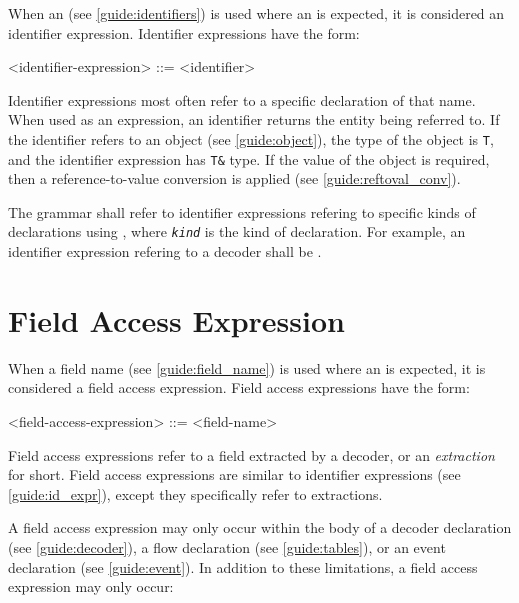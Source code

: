 When an  (see \ref{guide:identifiers}) is used where an  is expected, it is considered an identifier expression. Identifier expressions have the form:

\begin{minip}
\begin{grammar}
<identifier-expression> ::= <identifier>
\end{grammar}
\end{minip}

Identifier expressions most often refer to a specific declaration of that name. When used as an expression, an identifier returns the entity being referred to. If the identifier refers to an object (see \ref{guide:object}), the type of the object is \texttt{T}, and the identifier expression has \texttt{T\&} type. If the value of the object is required, then a reference-to-value conversion is applied (see \ref{guide:reftoval_conv}).

The grammar shall refer to identifier expressions refering to specific kinds of declarations using , where \texttt{\textit{kind}} is the kind of declaration. For example, an identifier expression refering to a decoder shall be .

\section{Field Access Expression} \label{guide:field_access_expr}

When a field name (see \ref{guide:field_name}) is used where an  is expected, it is considered a field access expression. Field access expressions have the form:

\begin{minip}
\begin{grammar}
<field-access-expression> ::= <field-name>
\end{grammar}
\end{minip}

Field access expressions refer to a field extracted by a decoder, or an \textit{extraction} for short. Field access expressions are similar to identifier expressions (see \ref{guide:id_expr}), except they specifically refer to extractions.

A field access expression may only occur within the body of a decoder declaration (see \ref{guide:decoder}), a flow declaration (see \ref{guide:tables}), or an event declaration (see \ref{guide:event}). In addition to these limitations, a field access expression may only occur:

